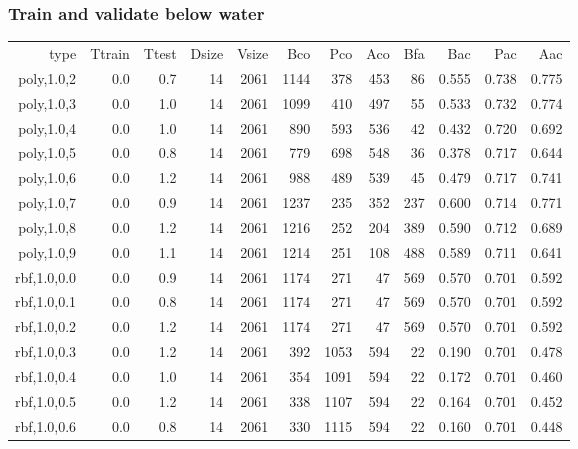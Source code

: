 \subsubsection{Train and validate below water}
\begin{longtable}{r|r|r|r|r|r|r|r|r|r|r|r}
          type &  Ttrain &   Ttest & Dsize & Vsize &   Bco &   Pco &   Aco &   Bfa &   Bac &   Pac &   Aac \\
   poly,1.0,2  &     0.0 &     0.7 &    14 &  2061 &  1144 &   378 &   453 &    86 & 0.555 & 0.738 & 0.775 \\
   poly,1.0,3  &     0.0 &     1.0 &    14 &  2061 &  1099 &   410 &   497 &    55 & 0.533 & 0.732 & 0.774 \\
   poly,1.0,4  &     0.0 &     1.0 &    14 &  2061 &   890 &   593 &   536 &    42 & 0.432 & 0.720 & 0.692 \\
   poly,1.0,5  &     0.0 &     0.8 &    14 &  2061 &   779 &   698 &   548 &    36 & 0.378 & 0.717 & 0.644 \\
   poly,1.0,6  &     0.0 &     1.2 &    14 &  2061 &   988 &   489 &   539 &    45 & 0.479 & 0.717 & 0.741 \\
   poly,1.0,7  &     0.0 &     0.9 &    14 &  2061 &  1237 &   235 &   352 &   237 & 0.600 & 0.714 & 0.771 \\
   poly,1.0,8  &     0.0 &     1.2 &    14 &  2061 &  1216 &   252 &   204 &   389 & 0.590 & 0.712 & 0.689 \\
   poly,1.0,9  &     0.0 &     1.1 &    14 &  2061 &  1214 &   251 &   108 &   488 & 0.589 & 0.711 & 0.641 \\
  rbf,1.0,0.0  &     0.0 &     0.9 &    14 &  2061 &  1174 &   271 &    47 &   569 & 0.570 & 0.701 & 0.592 \\
  rbf,1.0,0.1  &     0.0 &     0.8 &    14 &  2061 &  1174 &   271 &    47 &   569 & 0.570 & 0.701 & 0.592 \\
  rbf,1.0,0.2  &     0.0 &     1.2 &    14 &  2061 &  1174 &   271 &    47 &   569 & 0.570 & 0.701 & 0.592 \\
  rbf,1.0,0.3  &     0.0 &     1.2 &    14 &  2061 &   392 &  1053 &   594 &    22 & 0.190 & 0.701 & 0.478 \\
  rbf,1.0,0.4  &     0.0 &     1.0 &    14 &  2061 &   354 &  1091 &   594 &    22 & 0.172 & 0.701 & 0.460 \\
  rbf,1.0,0.5  &     0.0 &     1.2 &    14 &  2061 &   338 &  1107 &   594 &    22 & 0.164 & 0.701 & 0.452 \\
  rbf,1.0,0.6  &     0.0 &     0.8 &    14 &  2061 &   330 &  1115 &   594 &    22 & 0.160 & 0.701 & 0.448 \\

\end{longtable}
